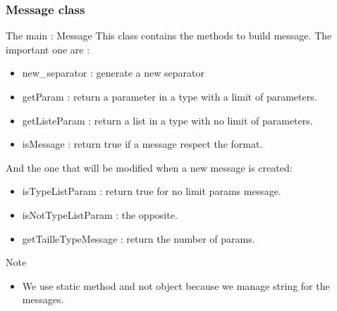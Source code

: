 \documentclass[9pt]{beamer}
\begin{document}
\begin{frame}
	\frametitle{ Message class }

	\begin{block}{The main : Message}
		This class contains the methods to build message. The important one are :
		\begin{itemize}
			\item<2->  new\_separator : generate a new separator
			\item<3-> getParam : return a parameter in a type with a limit of parameters.
			\item<4-> getListeParam : return a list in a type with no limit of parameters.
			\item<5->  isMessage : return true if a message respect the format.
		\end{itemize}
		And the one that will be modified when a new message is created:
		\begin{itemize}
			\item<6-> isTypeListParam : return true for no limit params message.
			\item<7-> isNotTypeListParam : the opposite.
			\item<8-> getTailleTypeMessage : return the number of params.
		\end{itemize}
	\end{block}
	\begin{block}{Note}
		\begin{itemize}
			\item<9-> \color{red} We use static method and not object because we manage string for the messages.
		\end{itemize}
	\end{block}
	\transdissolve
\end{frame}
\end{document}
